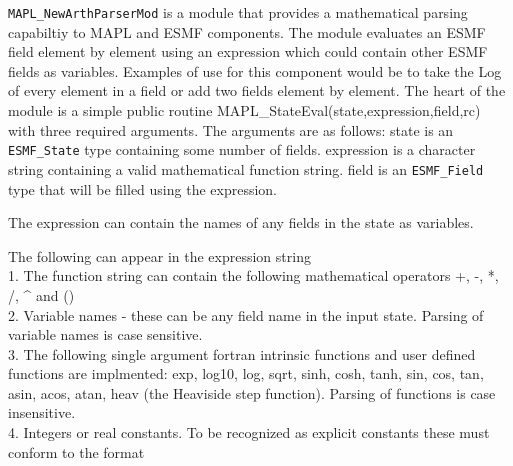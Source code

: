 %  
%  
%  
{\tt MAPL\_NewArthParserMod} is a module that provides a mathematical
parsing capabiltiy to MAPL and ESMF components. The module evaluates an ESMF field element by element
using an expression which could contain other ESMF fields as variables.
Examples of use for this component would be to take the Log of every element in a field
or add two fields element by element.
The heart of the module is
a simple public routine MAPL\_StateEval(state,expression,field,rc) with three required arguments.
The arguments are as follows: \newline
state is an \texttt{ESMF\_State} type containing some number of fields.\newline
expression is a character string containing a valid mathematical function string.\newline
field is an \texttt{ESMF\_Field} type that will be filled using the expression.\newline

The expression can contain the names of any fields in the state as variables.

The following can appear in the expression string\\
1. The function string can contain the following mathematical operators +, -, *, /, \^{} and ()\\
2. Variable names - these can be any field name in the input state. Parsing of variable names is case sensitive.\\
3. The following single argument fortran intrinsic functions and user defined functions are implmented:
exp, log10, log, sqrt, sinh, cosh, tanh, sin, cos, tan, asin,
acos, atan, heav (the Heaviside step function).
Parsing of functions is case insensitive.\\
4. Integers or real constants.
To be recognized
as explicit constants these must conform to the format


